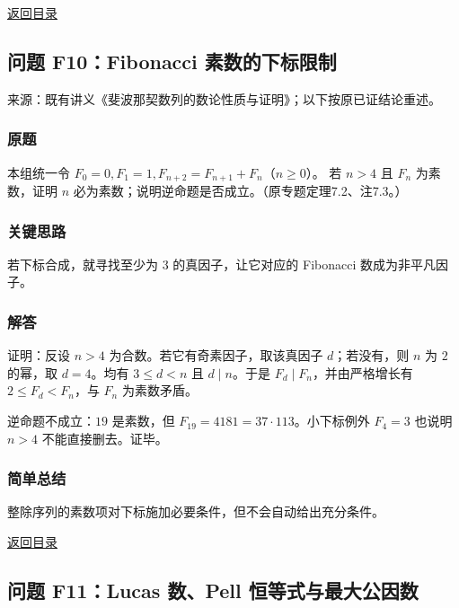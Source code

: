 \documentclass[11pt,a4paper]{article}
\begin{document}
\noindent\hyperref[contents]{返回目录}

\subsection{问题 F10：Fibonacci
素数的下标限制}\label{ux95eeux9898-f10fibonacci-ux7d20ux6570ux7684ux4e0bux6807ux9650ux5236}

来源：既有讲义《斐波那契数列的数论性质与证明》；以下按原已证结论重述。

\subsubsection{原题}\label{ux539fux9898-42}

本组统一令 \(F_0=0,F_1=1,F_{n+2}=F_{n+1}+F_n\)（\(n\ge0\)）。 若 \(n>4\)
且 \(F_n\) 为素数，证明 \(n\)
必为素数；说明逆命题是否成立。（原专题定理7.2、注7.3。）

\subsubsection{关键思路}\label{ux5173ux952eux601dux8def-42}

若下标合成，就寻找至少为 \(3\) 的真因子，让它对应的 Fibonacci
数成为非平凡因子。

\subsubsection{解答}\label{ux89e3ux7b54-42}

证明：反设 \(n>4\) 为合数。若它有奇素因子，取该真因子 \(d\)；若没有，则
\(n\) 为 \(2\) 的幂，取 \(d=4\)。均有 \(3\le d<n\) 且 \(d\mid n\)。于是
\(F_d\mid F_n\)，并由严格增长有 \(2\le F_d<F_n\)，与 \(F_n\)
为素数矛盾。

逆命题不成立：\(19\) 是素数，但 \(F_{19}=4181=37\cdot113\)。小下标例外
\(F_4=3\) 也说明 \(n>4\) 不能直接删去。证毕。

\subsubsection{简单总结}\label{ux7b80ux5355ux603bux7ed3-42}

整除序列的素数项对下标施加必要条件，但不会自动给出充分条件。

\noindent\hyperref[contents]{返回目录}

\subsection{问题 F11：Lucas 数、Pell
恒等式与最大公因数}\label{ux95eeux9898-f11lucas-ux6570pell-ux6052ux7b49ux5f0fux4e0eux6700ux5927ux516cux56e0ux6570}
\end{document}
